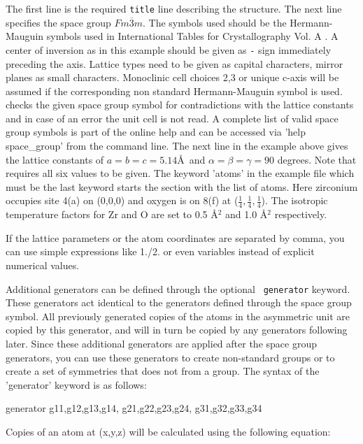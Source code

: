 The first line is the required {\tt title} line describing the
structure. The next line specifies the space group
$Fm\overline{3}m$.  The symbols used should be the Hermann-Mauguin
symbols used in International Tables for Crystallography Vol.  A
\cite{tables}.  A center of inversion as in this example should be
given as {\tt -} sign immediately preceding the axis. Lattice types need
to be given as capital characters, mirror planes as small
characters.  Monoclinic cell choices 2,3 or unique c-axis will be
assumed if the corresponding non standard Hermann-Mauguin symbol is
used. \Discus checks the given space group symbol for
contradictions with the lattice constants and in case of an error
the unit cell is not read.  A complete list of valid space group
symbols is part of the online help and can be accessed via 'help
space\_group' from the \Discus command line.  The next line in the
example above gives the lattice constants of $a=b=c=5.14$\AA \ and
$\alpha=\beta=\gamma=90$ degrees.  Note that \Discus requires
all six values to be given.  The keyword 'atoms' in the example file
which must be the last keyword starts the section with the list of
atoms.  Here zirconium occupies site 4(a) on (0,0,0) and oxygen is
on 8(f) at ($\frac{1}{4}, \frac{1}{4}, \frac{1}{4}$).  The isotropic
temperature factors for Zr and O are set to 0.5 \AA$^{2}$ and 1.0
\AA$^{2}$ respectively. \par

If the lattice parameters or the atom coordinates are separated
by comma, you can use simple expressions like 1./2. or even 
variables instead of explicit numerical values. \par

Additional generators can be defined through the optional {\tt
generator} keyword.  These generators act identical to the
generators defined through the space group symbol.  All previously
generated copies of the atoms in the asymmetric unit are copied by
this generator, and will in turn be copied by any generators
following later.  Since these additional generators are applied
after the space group generators, you can use these generators to
create non-standard groups or to create a set of symmetries that
does not from a group. The syntax of the 'generator' keyword is as
follows:

\begin{MacVerbatim}
    generator g11,g12,g13,g14, g21,g22,g23,g24, g31,g32,g33,g34
\end{MacVerbatim}

Copies of an atom at (x,y,z) will be calculated using the following
equation:

